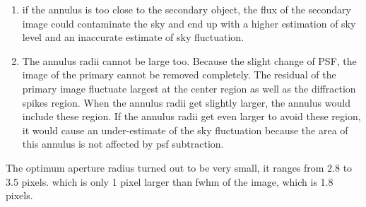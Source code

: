 \documentclass[paper=letter, fontsize=11pt]{scrartcl} %
\numberwithin{equation}{section} %
\numberwithin{figure}{section} %
\numberwithin{table}{section} %
\begin{document}
\begin{enumerate}
\item if the annulus is too close to the secondary object, the flux of the secondary image could contaminate the sky and end up with a higher estimation of sky level and an inaccurate estimate of sky fluctuation.    
\item The annulus radii cannot be large too. Because the slight change of
PSF, the image of the primary cannot be removed completely. The
residual of the primary image fluctuate largest at the center region
as well as the diffraction spikes region.  When the annulus radii get
slightly larger, the annulus would include these region. If the
annulus radii get even larger to avoid these region, it would cause an
under-estimate of the sky fluctuation because the area of this annulus
is not affected by psf subtraction.
\end{enumerate}

The optimum aperture radius turned out to be very small, it ranges from 2.8 to 3.5 pixels. which is only 1 pixel larger than fwhm of the image, which is 1.8 pixels.
\end{document}
